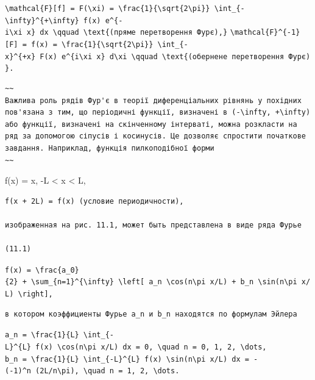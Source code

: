 \documentclass[
  ukrainian,
]{article}
\begin{document}
\texttt{\textbackslash{}mathcal\{F\}{[}f{]}\ =\ F(\textbackslash{}xi)\ =\ \textbackslash{}frac\{1\}\{\textbackslash{}sqrt\{2\textbackslash{}pi\}\}\ \textbackslash{}int\_\{-\textbackslash{}infty\}\^{}\{+\textbackslash{}infty\}\ f(x)\ e\^{}\{-i\textbackslash{}xi\ x\}\ dx\ \textbackslash{}qquad\ \textbackslash{}text\{(пряме\ перетворення\ Фур\textquotesingle{}є),\}}
\texttt{\textbackslash{}mathcal\{F\}\^{}\{-1\}{[}F{]}\ =\ f(x)\ =\ \textbackslash{}frac\{1\}\{\textbackslash{}sqrt\{2\textbackslash{}pi\}\}\ \textbackslash{}int\_\{-x\}\^{}\{+x\}\ F(x)\ e\^{}\{i\textbackslash{}xi\ x\}\ d\textbackslash{}xi\ \textbackslash{}qquad\ \textbackslash{}text\{(обернене\ перетворення\ Фур\textquotesingle{}є)\}.}

\begin{verbatim}
~~
Важлива роль рядів Фур'є в теорії диференціальних рівнянь у похідних пов'язана з тим, що періодичні функції, визначені в (-\infty, +\infty) або функції, визначені на скінченному інтерваті, можна розкласти на ряд за допомогою сіпусів і косинусів. Це дозволяє спростити початкове завдання. Наприклад, функція пилкоподібної форми
~~
\end{verbatim}

f(x) = x, -L \textless{} x \textless{} L,

\begin{verbatim}
f(x + 2L) = f(x) (условие периодичности),

изображенная на рис. 11.1, может быть представлена в виде ряда Фурье

(11.1)
\end{verbatim}

\texttt{f(x)\ =\ \textbackslash{}frac\{a\_0\}\{2\}\ +\ \textbackslash{}sum\_\{n=1\}\^{}\{\textbackslash{}infty\}\ \textbackslash{}left{[}\ a\_n\ \textbackslash{}cos(n\textbackslash{}pi\ x/L)\ +\ b\_n\ \textbackslash{}sin(n\textbackslash{}pi\ x/L)\ \textbackslash{}right{]},}

\begin{verbatim}
в котором коэффициенты Фурье a_n и b_n находятся по формулам Эйлера
\end{verbatim}

\texttt{a\_n\ =\ \textbackslash{}frac\{1\}\{L\}\ \textbackslash{}int\_\{-L\}\^{}\{L\}\ f(x)\ \textbackslash{}cos(n\textbackslash{}pi\ x/L)\ dx\ =\ 0,\ \textbackslash{}quad\ n\ =\ 0,\ 1,\ 2,\ \textbackslash{}dots,}
\texttt{b\_n\ =\ \textbackslash{}frac\{1\}\{L\}\ \textbackslash{}int\_\{-L\}\^{}\{L\}\ f(x)\ \textbackslash{}sin(n\textbackslash{}pi\ x/L)\ dx\ =\ -(-1)\^{}n\ (2L/n\textbackslash{}pi),\ \textbackslash{}quad\ n\ =\ 1,\ 2,\ \textbackslash{}dots.}
\end{document}
